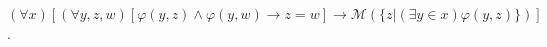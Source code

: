 $(\forall x)[(\forall y, z, w)[\varphi(y, z) \wedge \varphi(y, w) \rightarrow z = w] \rightarrow \mathcal{M}(\{z | (\exists y \in x) \varphi(y, z)\})]$.

